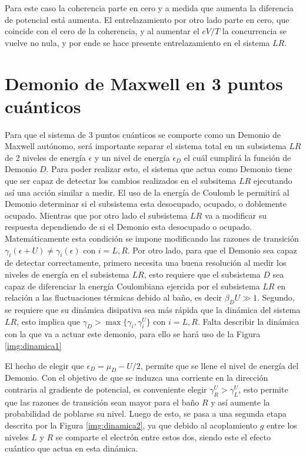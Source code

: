     
Para este caso la coherencia parte en cero y a medida que aumenta la diferencia de potencial está aumenta. El entrelazamiento por otro lado parte en cero, que coincide con el cero de la coherencia, y al aumentar el $eV/T$ la concurrencia se vuelve no nula, y por ende se hace presente entrelazamiento en el sistema $LR$.

\newpage

\section{Demonio de Maxwell en 3 puntos cuánticos}
Para que el sistema de 3 puntos cuánticos se comporte como un Demonio de Maxwell autónomo, será importante separar el sistema total en un subsistema $LR$ de 2 niveles de energía $\epsilon$ y un nivel de energía $\epsilon_{D}$ el cuál cumplirá la función de Demonio $D$. Para poder realizar esto, el sistema que actua como Demonio tiene que ser capaz de detectar los cambios realizados en el subsitema $LR$ ejecutando así una acción similar a medir. El uso de la energía de Coulomb le permitirá al Demonio determinar si el subsistema esta desocupado, ocupado, o doblemente ocupado. Mientras que por otro lado el subsistema $LR$ va a modificar su respuesta dependiendo de si el Demonio esta desocupado o ocupado. Matemáticamente esta condición se impone modificando las razones de transición $\gamma_{i}(\epsilon + U)\neq \gamma_{i}(\epsilon)$ con $i=L,R$. Por otro lado, para que el Demonio sea capaz de detectar correctamente, primero necesita una buena resolución al medir los niveles de energía en el subsistema $LR$, esto requiere que el subsistema $D$ sea capaz de diferenciar la energía Coulombiana ejercida por el subsistema $LR$ en relación a las fluctuaciones térmicas debido al baño, es decir $\beta_{D}U \gg 1$. Segundo, se requiere que su dinámica disipativa sea más rápida que la dinámica del sistema $LR$, esto implica que $\gamma_{D}> \max\{\gamma_{i},\gamma^{U}_{i}\}$ con $i=L,R$. Falta describir la dinámica con la que va a actuar este demonio, para ello se hará uso de la Figura \ref{img:dinamica1}


El hecho de elegir que $\epsilon_{D} = \mu_{D} - U/2$, permite que se llene el nivel de energía del Demonio. Con el objetivo de que se induzca una corriente en la dirección contraria al gradiente de potencial, es conveniente elegir $\gamma^{U}_{R} > \gamma^{U}_{L}$, esto permite que las razones de transición sean mayor para el baño $R$ y así aumente la probabilidad de poblarse su  nivel. Luego de esto, se pasa a una segunda etapa descrita por la Figura \ref{img:dinamica2}, ya que debido al acoplamiento $g$ entre los niveles $L$ y $R$ se comparte el electrón entre estos dos, siendo este el efecto cuántico que actua en esta dinámica.  

